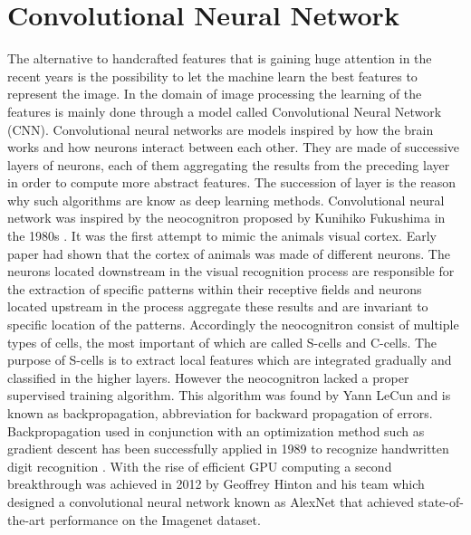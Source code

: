 \chapter{Convolutional Neural Network}

  The alternative to handcrafted features that is gaining huge attention in the recent years is the possibility to let the machine learn the best features to represent the image. In the domain of image processing the learning of the features is mainly done through a model called Convolutional Neural Network (CNN). Convolutional neural networks are models inspired by how the brain works and how neurons interact between each other. They are made of successive layers of neurons, each of them aggregating the results from the preceding layer in order to compute more abstract features. The succession of layer is the reason why such algorithms are know as deep learning methods. Convolutional neural network was inspired by the neocognitron proposed by Kunihiko Fukushima in the 1980s \cite{fukushima1980neocognitron}. It was the first attempt to mimic the animals visual cortex. Early paper \cite{hubel1959receptive} had shown that the cortex of animals was made of different neurons. The neurons located downstream in the visual recognition process are responsible for the extraction of specific patterns within their receptive fields and neurons located upstream in the process aggregate these results and are invariant to specific location of the patterns. Accordingly the neocognitron consist of multiple types of cells, the most important of which are called S-cells and C-cells. The purpose of S-cells is to extract local features which are integrated gradually and classified in the higher layers. However the neocognitron lacked a proper supervised training algorithm. This algorithm was found by Yann LeCun and is known as backpropagation, abbreviation for backward propagation of errors. Backpropagation used in conjunction with an optimization method such as gradient descent has been successfully applied in 1989 to recognize handwritten digit recognition \cite{lecun1989backpropagation}. With the rise of efficient GPU computing a second breakthrough was achieved in 2012 by Geoffrey Hinton and his team which designed a convolutional neural network known as AlexNet \cite{krizhevsky2012imagenet} that achieved state-of-the-art performance on the Imagenet dataset.

